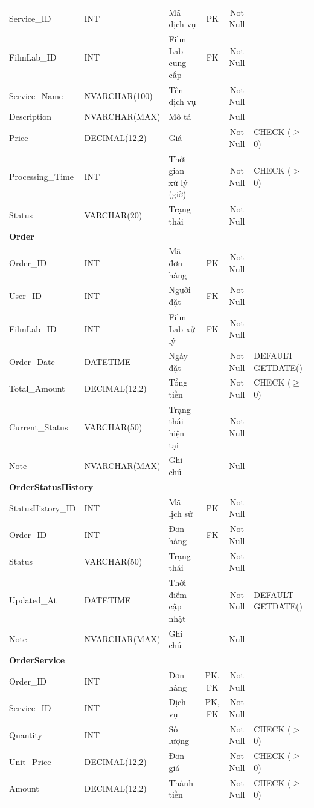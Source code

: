\documentclass[12pt,a4paper]{article}
\begin{document}
\begin{longtable}{|l|l|p{4.2cm}|c|c|p{3.5cm}|}
\hline
Service\_ID & INT & Mã dịch vụ & PK & Not Null & \\
FilmLab\_ID & INT & Film Lab cung cấp & FK & Not Null & \\
Service\_Name & NVARCHAR(100) & Tên dịch vụ & & Not Null & \\
Description & NVARCHAR(MAX) & Mô tả & & Null & \\
Price & DECIMAL(12,2) & Giá & & Not Null & CHECK ($\geq$ 0) \\
Processing\_Time & INT & Thời gian xử lý (giờ) & & Not Null & CHECK ($>$ 0) \\
Status & VARCHAR(20) & Trạng thái & & Not Null & \\
\hline
\multicolumn{6}{|l|}{\textbf{Order}} \\
\hline
Order\_ID & INT & Mã đơn hàng & PK & Not Null & \\
User\_ID & INT & Người đặt & FK & Not Null & \\
FilmLab\_ID & INT & Film Lab xử lý & FK & Not Null & \\
Order\_Date & DATETIME & Ngày đặt & & Not Null & DEFAULT GETDATE() \\
Total\_Amount & DECIMAL(12,2) & Tổng tiền & & Not Null & CHECK ($\geq$ 0) \\
Current\_Status & VARCHAR(50) & Trạng thái hiện tại & & Not Null & \\
Note & NVARCHAR(MAX) & Ghi chú & & Null & \\
\hline
\multicolumn{6}{|l|}{\textbf{OrderStatusHistory}} \\
\hline
StatusHistory\_ID & INT & Mã lịch sử & PK & Not Null & \\
Order\_ID & INT & Đơn hàng & FK & Not Null & \\
Status & VARCHAR(50) & Trạng thái & & Not Null & \\
Updated\_At & DATETIME & Thời điểm cập nhật & & Not Null & DEFAULT GETDATE() \\
Note & NVARCHAR(MAX) & Ghi chú & & Null & \\
\hline
\multicolumn{6}{|l|}{\textbf{OrderService}} \\
\hline
Order\_ID & INT & Đơn hàng & PK, FK & Not Null & \\
Service\_ID & INT & Dịch vụ & PK, FK & Not Null & \\
Quantity & INT & Số lượng & & Not Null & CHECK ($>$ 0) \\
Unit\_Price & DECIMAL(12,2) & Đơn giá & & Not Null & CHECK ($\geq$ 0) \\
Amount & DECIMAL(12,2) & Thành tiền & & Not Null & CHECK ($\geq$ 0) \\

\end{longtable}
\end{document}
